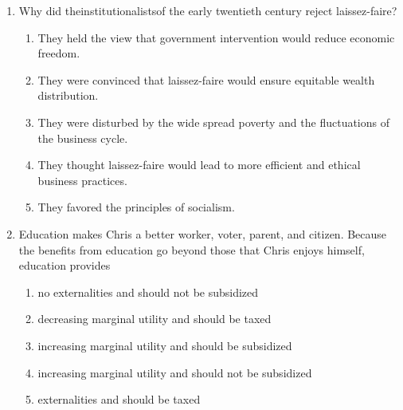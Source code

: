 \documentclass[12pt]{article}
\begin{document}
\begin{enumerate}[label=\arabic*.]
\begin{enumerate}[label=(\alph*)]
    \item A government-issued bond or security
    \item A method of payment
\end{enumerate}
\item Why did theinstitutionalistsof the early twentieth century reject laissez-faire?
\begin{enumerate}[label=(\alph*)]
    \item They held the view that government intervention would reduce economic freedom.
    \item They were convinced that laissez-faire would ensure equitable wealth distribution.
    \item They were disturbed by the wide spread poverty and the fluctuations of the business cycle.
    \item They thought laissez-faire would lead to more efficient and ethical business practices.
    \item They favored the principles of socialism.
\end{enumerate}
\item Education makes Chris a better worker, voter, parent, and citizen. Because the benefits from education go beyond those that Chris enjoys himself, education provides
\begin{enumerate}[label=(\alph*)]
    \item no externalities and should not be subsidized
    \item decreasing marginal utility and should be taxed
    \item increasing marginal utility and should be subsidized
    \item increasing marginal utility and should not be subsidized
    \item externalities and should be taxed
\end{enumerate}
\end{enumerate}
\end{document}
